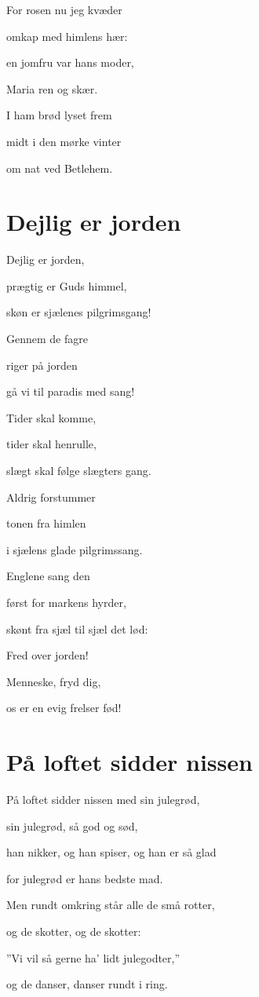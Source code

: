\documentclass[11pt]{beamer}
\begin{document}
\begin{frame}
For rosen nu jeg kvæder

omkap med himlens hær:

en jomfru var hans moder,

Maria ren og skær.

I ham brød lyset frem

midt i den mørke vinter

om nat ved Betlehem.
\end{frame}
\toc

\section{Dejlig er jorden}
\begin{frame}
Dejlig er jorden,

prægtig er Guds himmel,

skøn er sjælenes pilgrimsgang!

Gennem de fagre

riger på jorden

gå vi til paradis med sang!
\end{frame}

\begin{frame}
Tider skal komme,

tider skal henrulle,

slægt skal følge slægters gang.

Aldrig forstummer

tonen fra himlen

i sjælens glade pilgrimssang.
\end{frame}

\begin{frame}
Englene sang den

først for markens hyrder,

skønt fra sjæl til sjæl det lød:

Fred over jorden!

Menneske, fryd dig,

os er en evig frelser fød! 
\end{frame}
\toc

\section{På loftet sidder nissen}
\begin{frame}

På loftet sidder nissen med sin julegrød,

sin julegrød, så god og sød,

han nikker, og han spiser, og han er så glad

for julegrød er hans bedste mad.

Men rundt omkring står alle de små rotter,

og de skotter, og de skotter:

''Vi vil så gerne ha' lidt julegodter,''

og de danser, danser rundt i ring.
\end{frame}
\end{document}
